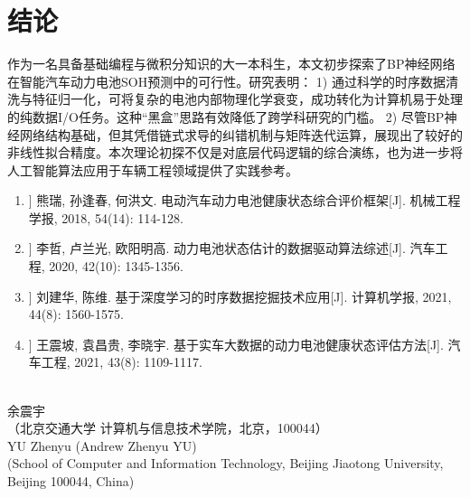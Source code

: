 \documentclass[a4paper,10.5pt]{article}
\begin{document}
\section{结论}

作为一名具备基础编程与微积分知识的大一本科生，本文初步探索了BP神经网络在智能汽车动力电池SOH预测中的可行性。研究表明：
1) 通过科学的时序数据清洗与特征归一化，可将复杂的电池内部物理化学衰变，成功转化为计算机易于处理的纯数据I/O任务。这种“黑盒”思路有效降低了跨学科研究的门槛。
2) 尽管BP神经网络结构基础，但其凭借链式求导的纠错机制与矩阵迭代运算，展现出了较好的非线性拟合精度。本次理论初探不仅是对底层代码逻辑的综合演练，也为进一步将人工智能算法应用于车辆工程领域提供了实践参考。

\vspace{2em}

\songti
\begin{enumerate}
    \itemsep=-2pt
    \item[[1]] 熊瑞, 孙逢春, 何洪文. 电动汽车动力电池健康状态综合评价框架[J]. 机械工程学报, 2018, 54(14): 114-128.
    \item[[2]] 李哲, 卢兰光, 欧阳明高. 动力电池状态估计的数据驱动算法综述[J]. 汽车工程, 2020, 42(10): 1345-1356.
    \item[[3]] 刘建华, 陈维. 基于深度学习的时序数据挖掘技术应用[J]. 计算机学报, 2021, 44(8): 1560-1575.
    \item[[4]] 王震坡, 袁昌贵, 李晓宇. 基于实车大数据的动力电池健康状态评估方法[J]. 汽车工程, 2021, 43(8): 1109-1117.
\end{enumerate}

\newpage
{}\\[5pt]
余震宇\\[5pt]
（北京交通大学 计算机与信息技术学院，北京，100044）\\[15pt]
YU Zhenyu (Andrew Zhenyu YU)\\[5pt]
(School of Computer and Information Technology, Beijing Jiaotong University, Beijing 100044, China)
\end{document}
